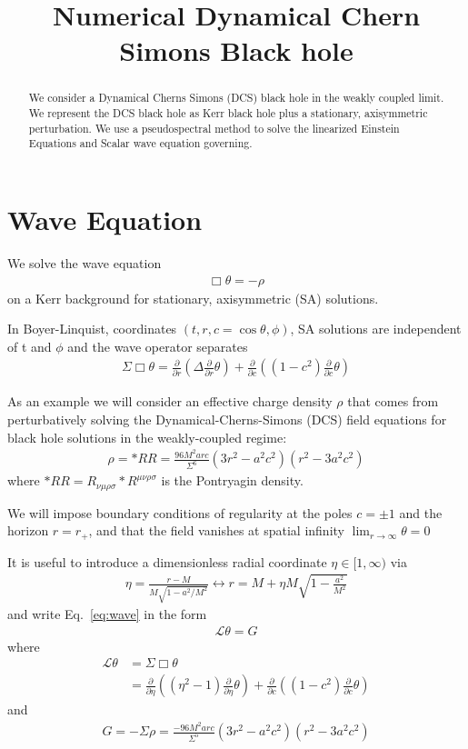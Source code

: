 \documentclass[aps,prd,amsmath,showpacs,amssymb,superscriptaddress,nofootinbib,longbibliography,eqsecnum,preprintnumbers]{revtex4-1}
\newcommand{\Caltech}{\affiliation{Theoretical Astrophysics 350-17, California Institute of Technology, Pasadena, CA 91125}}
\begin{document}
\title{Numerical Dynamical Chern Simons Black hole}
\begin{abstract}
We consider a Dynamical Cherns Simons (DCS) black hole in the weakly coupled limit. We represent the DCS black hole as Kerr black hole plus a stationary, axisymmetric perturbation.
We use a pseudospectral method to solve the linearized Einstein Equations and Scalar wave equation governing.
\end{abstract}
\maketitle
\tableofcontents

\section{Wave Equation}
We solve the wave equation 
\begin{align}
\Box \theta =-\rho \label{eq:wave}
\end{align}
on a Kerr background for stationary, axisymmetric (SA) solutions. 

In Boyer-Linquist, coordinates $(t,r,c=\cos\theta,\phi)$, SA solutions are independent of t and $\phi$ and the wave operator separates
\begin{align}
\Sigma \Box \theta= \frac{\partial}{\partial r}\left(\Delta \frac{\partial }{\partial r}\theta\right) + \frac{\partial}{\partial c}\left((1-c^2) \frac{\partial }{\partial c}\theta\right)
\end{align}

As an example we will consider an effective charge density $\rho$ that comes from perturbatively solving the Dynamical-Cherns-Simons (DCS) field equations for black hole solutions in the weakly-coupled regime:
\begin{align}
\rho=*RR =\frac{96M^2arc}{\Sigma^6}(3r^2-a^2c^2)(r^2-3a^2c^2)
\end{align}
where $*RR=R_{\nu \mu\rho\sigma}*R^{\mu\nu\rho\sigma}$ is the Pontryagin density.

We will impose boundary conditions of regularity at the poles $c=\pm 1$ and the horizon $r=r_+$, and that the field vanishes at spatial infinity $\lim_{r\to \infty}\theta= 0$

It is useful to introduce a dimensionless radial coordinate $\eta \in [1,\infty)$ via
\begin{align}
\eta=\frac{r-M}{M\sqrt{1-a^2/M^2}} \leftrightarrow r=M+\eta M\sqrt{1-\frac{a^2}{M^2}}
\end{align}
and write Eq.~\eqref{eq:wave} in the form
\begin{align}
\mathcal{L}\theta=G
\end{align}
where
\begin{align}
\mathcal{L}\theta&=\Sigma \Box\theta \\
&= \frac{\partial}{\partial \eta}\left((\eta^2-1)\frac{\partial }{\partial \eta}\theta\right) + \frac{\partial}{\partial c}\left((1-c^2) \frac{\partial }{\partial c}\theta\right)
\end{align}
and 
\begin{align}
G=-\Sigma \rho=\frac{-96M^2arc}{\Sigma^5}(3r^2-a^2c^2)(r^2-3a^2c^2)
\end{align}
\end{document}
